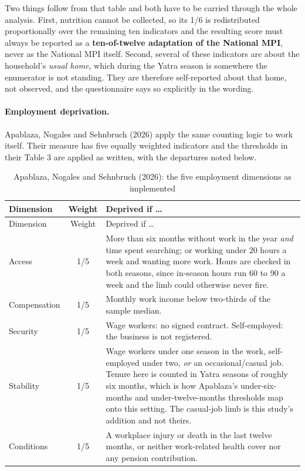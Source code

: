 \documentclass[11pt]{article}
\begin{document}
\noindent Two things follow from that table and both have to be carried through the whole
analysis. First, nutrition cannot be collected, so its 1/6 is redistributed proportionally over
the remaining ten indicators and the resulting score must always be reported as a
\textbf{ten-of-twelve adaptation of the National MPI}, never as the National MPI itself.
Second, several of these indicators are about the household's \emph{usual home}, which during
the Yatra season is somewhere the enumerator is not standing. They are therefore self-reported
about that home, not observed, and the questionnaire says so explicitly in the wording.

\paragraph{Employment deprivation.} Apablaza, Nogales and Sehnbruch (2026) apply the same
counting logic to work itself. Their measure has five equally weighted indicators and the
thresholds in their Table 3 are applied as written, with the departures noted below.

\begin{longtable}{@{}p{2.3cm}c p{10.3cm}@{}}
\caption{Apablaza, Nogales and Sehnbruch (2026): the five employment dimensions as implemented}\\
\toprule
Dimension & Weight & Deprived if \ldots \\
\midrule
\endfirsthead
\toprule
Dimension & Weight & Deprived if \ldots \\
\midrule
\endhead
Access & 1/5 & More than six months without work in the year \emph{and} time spent searching; or working under 20 hours a week and wanting more work. Hours are checked in both seasons, since in-season hours run 60 to 90 a week and the limb could otherwise never fire. \\
Compensation & 1/5 & Monthly work income below two-thirds of the sample median. \\
Security & 1/5 & Wage workers: no signed contract. Self-employed: the business is not registered. \\
Stability & 1/5 & Wage workers under one season in the work, self-employed under two, \emph{or} an occasional/casual job. Tenure here is counted in Yatra seasons of roughly six months, which is how Apablaza's under-six-months and under-twelve-months thresholds map onto this setting. The casual-job limb is this study's addition and not theirs. \\
Conditions & 1/5 & A workplace injury or death in the last twelve months, or neither work-related health cover nor any pension contribution. \\
\bottomrule
\end{longtable}
\end{document}

